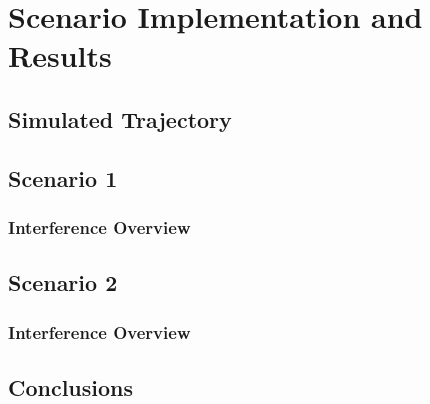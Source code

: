 \chapter{Scenario Implementation and Results}

\section{Simulated Trajectory}

\section{Scenario 1}

\subsection{Interference Overview}

\section{Scenario 2}

\subsection{Interference Overview}

\section{Conclusions}